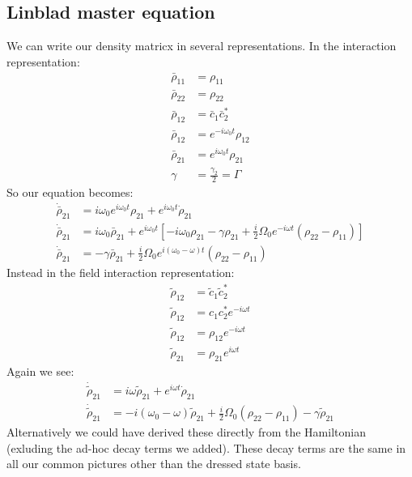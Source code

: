 \subsection{Linblad master equation}
We can write our density matricx in several representations. In the interaction representation:
\begin{align*}
	\bar{\rho}_{11} &= \rho_{11} \\
	\bar{\rho}_{22} &= \rho_{22} \\
	\bar{\rho}_{12} &= \bar{c}_1\bar{c}_2^* \\
	\bar{\rho}_{12} &= e^{-i\omega_0 t}\rho_{12} \\
	\bar{\rho}_{21} &= e^{i\omega_0 t}\rho_{21} \\
	\gamma &= \frac{\gamma_2}{2} = \Gamma
\end{align*}
So our equation becomes:
\begin{align*}
	\dot{\bar{\rho}}_{21} &= i\omega_0 e^{i\omega_0 t}\rho_{21} + e^{i\omega_0 t} \dot{\rho}_{21} \\
	\dot{\bar{\rho}}_{21} &= i\omega_0 \bar{\rho}_{21} + e^{i\omega_0 t} \left[-i\omega_0\rho_{21} - \gamma\rho_{21} + \frac{i}{2} \Omega_0 e^{-i\omega t}(\rho_{22} - \rho_{11})\right] \\
	\dot{\bar{\rho}}_{21} &= -\gamma\bar{\rho}_{21} + \frac{i}{2}\Omega_0 e^{i(\omega_0-\omega)t}(\rho_{22}-\rho_{11})
\end{align*}
Instead in the field interaction representation:
\begin{align*}
	\tilde{\rho}_{12} &= \tilde{c}_1\tilde{c}_2^* \\
	\tilde{\rho}_{12} &= c_1c_2^* e^{-i\omega t} \\
	\tilde{\rho}_{12} &= \rho_{12} e^{-i\omega t} \\
	\tilde{\rho}_{21} &= \rho_{21} e^{i\omega t}
\end{align*}
Again we see:
\begin{align*}
	\dot{\tilde{\rho}}_{21} &= i\omega\tilde{\rho}_{21} + e^{i\omega t} \dot{\rho}_{21} \\
	\dot{\tilde{\rho}}_{21} &= -i(\omega_0-\omega)\tilde{\rho}_{21} + \frac{i}{2} \Omega_0 (\rho_{22} - \rho_{11}) -\gamma\tilde{\rho}_{21}
\end{align*}
Alternatively we could have derived these directly from the Hamiltonian (exluding the ad-hoc decay terms we added). These decay terms are the same in all our common pictures other than the dressed state basis.
